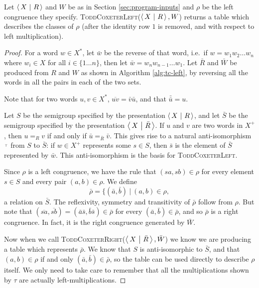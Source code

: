\begin{theorem}
  Let $\left\langle\,X ~\middle|~ R\,\right\rangle$ and $W$ be as in Section \ref{sec:program-inputs} and $\rho$
  be the left congruence they specify.
  \textsc{ToddCoxeterLeft}($\left\langle\,X ~\middle|~ R\,\right\rangle, W$) returns a table which describes the
  classes of $\rho$ (after the identity row $1$ is removed, and with respect to
  left multiplication).
  \begin{proof}
    For a word $w \in X^*$, let $\bar w$ be the reverse of that word, i.e.~if
    $w = w_1 w_2 \ldots w_n$ where $w_i \in X$ for all $i \in \{1 \ldots n\}$,
    then let $\bar w = w_n w_{n-1} \ldots w_1$.  Let $\bar R$ and $\bar W$ be
    produced from $R$ and $W$ as shown in Algorithm \ref{alg:tc-left}, by
    reversing all the words in all the pairs in each of the two sets.

    Note that for two words $u, v \in X^*$, $\overline{uv} = \bar v \bar u$, and
    that $\bar{\bar u} = u$.

    Let $S$ be the semigroup specified by the presentation $\left\langle\,X ~\middle|~ R\,\right\rangle$, and let
    $\bar S$ be the semigroup specified by the presentation $\left\langle\,X ~\middle|~ \bar R\,\right\rangle$.
    If $u$ and $v$ are two words in $X^+$, then $u =_R v$ if and only if
    $\bar u =_{\bar R} \bar v$.  This gives rise to a natural anti-isomorphism
    $\bar \cdot$ from $S$ to $\bar S$: if $w \in X^+$ represents some $s \in S$,
    then $\bar s$ is the element of $\bar S$ represented by $\bar w$.  This
    anti-isomorphism is the basis for \textsc{ToddCoxeterLeft}.

    Since $\rho$ is a left congruence, we have the rule that $(sa, sb) \in \rho$
    for every element $s \in S$ and every pair $(a,b) \in \rho$.  We define
    $$\bar\rho = \{(\bar a, \bar b) ~|~ (a,b) \in \rho,$$
    a relation on $\bar S$.  The reflexivity, symmetry and transitivity of
    $\bar\rho$ follow from $\rho$.  But note that
    $(\overline{sa}, \overline{sb}) = (\bar a \bar s, \bar b \bar s) \in
    \bar\rho$
    for every $(\bar a, \bar b) \in \bar\rho$, and so $\bar\rho$ is a right
    congruence.  In fact, it is the right congruence generated by $\bar W$.

    Now when we call \textsc{ToddCoxeterRight}($\left\langle\,X ~\middle|~ \bar R\,\right\rangle, \bar W$) we
    know we are producing a table which represents $\bar\rho$.  We know that $S$
    is anti-isomorphic to $\bar S$, and that $(a,b) \in \rho$ if and only
    $(\bar a, \bar b) \in \bar\rho$, so the table can be used directly to
    describe $\rho$ itself.  We only need to take care to remember that all the
    multiplications shown by $\tau$ are actually left-multiplications.
  \end{proof}
\end{theorem}


